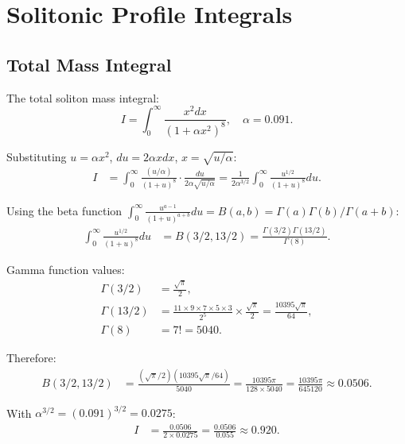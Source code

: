 \documentclass[11pt,a4paper]{article}
\theoremstyle{definition}
\theoremstyle{remark}
\begin{document}
\appendix

\section{Solitonic Profile Integrals}
\label{app:integrals}

\subsection{Total Mass Integral}

The total soliton mass integral:
\begin{equation}
I = \int_0^\infty \frac{x^2 dx}{(1 + \alpha x^2)^8}, \quad \alpha = 0.091.
\end{equation}

Substituting $u = \alpha x^2$, $du = 2\alpha x dx$, $x = \sqrt{u/\alpha}$:
\begin{align}
I &= \int_0^\infty \frac{(u/\alpha)}{(1+u)^8} \cdot \frac{du}{2\alpha\sqrt{u/\alpha}} = \frac{1}{2\alpha^{3/2}} \int_0^\infty \frac{u^{1/2}}{(1+u)^8} du.
\end{align}

Using the beta function $\int_0^\infty \frac{u^{a-1}}{(1+u)^{a+b}} du = B(a,b) = \Gamma(a)\Gamma(b)/\Gamma(a+b)$:
\begin{align}
\int_0^\infty \frac{u^{1/2}}{(1+u)^8} du &= B(3/2, 13/2) = \frac{\Gamma(3/2)\Gamma(13/2)}{\Gamma(8)}.
\end{align}

Gamma function values:
\begin{align}
\Gamma(3/2) &= \frac{\sqrt{\pi}}{2}, \\
\Gamma(13/2) &= \frac{11 \times 9 \times 7 \times 5 \times 3}{2^5} \times \frac{\sqrt{\pi}}{2} = \frac{10395\sqrt{\pi}}{64}, \\
\Gamma(8) &= 7! = 5040.
\end{align}

Therefore:
\begin{align}
B(3/2, 13/2) &= \frac{(\sqrt{\pi}/2)(10395\sqrt{\pi}/64)}{5040} = \frac{10395 \pi}{128 \times 5040} = \frac{10395\pi}{645120} \approx 0.0506.
\end{align}

With $\alpha^{3/2} = (0.091)^{3/2} = 0.0275$:
\begin{align}
I &= \frac{0.0506}{2 \times 0.0275} = \frac{0.0506}{0.055} \approx 0.920.
\end{align}
\end{document}
